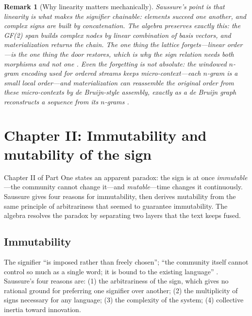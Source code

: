 \documentclass[11pt,a4paper]{article}
\newtheorem{remark}[principle]{Remark}
\theoremstyle{remark}
\begin{document}
\begin{remark}[Why linearity matters mechanically]
Saussure's point is that linearity is what makes the signifier \emph{chainable}:
elements succeed one another, and complex signs are built by concatenation.
The algebra preserves exactly this: the GF(2) span builds complex nodes by
linear combination of basis vectors, and materialization returns the chain. The
one thing the lattice forgets---linear \emph{order}---is the one thing the
door restores, which is why the sign relation needs both morphisms and not one
\cite{attention2026}. Even the forgetting is not absolute: the windowed
$n$-gram encoding used for ordered streams keeps \emph{micro-context}---each
$n$-gram is a small local order---and materialization can reassemble the
original order from these micro-contexts by de Bruijn-style assembly, exactly
as a de Bruijn graph reconstructs a sequence from its $n$-grams
\cite{state2026}.
\end{remark}

\section{Chapter II: Immutability and mutability of the sign}
\label{sec:ch2}

Chapter II of Part One states an apparent paradox: the sign is at once
\emph{immutable}---the community cannot change it---and \emph{mutable}---time
changes it continuously. Saussure gives four reasons for immutability, then
derives mutability from the same principle of arbitrariness that seemed to
guarantee immutability. The algebra resolves the paradox by separating two
layers that the text keeps fused.

\subsection{Immutability}
\label{sec:immutability}

The signifier ``is imposed rather than freely chosen''; ``the community itself
cannot control so much as a single word; it is bound to the existing language''
\cite[Part I, ch.~II, \S2]{harris1983}. Saussure's four reasons are: (1) the
arbitrariness of the sign, which gives no rational ground for preferring one
signifier over another; (2) the multiplicity of signs necessary for any
language; (3) the complexity of the system; (4) collective inertia toward
innovation.
\end{document}
